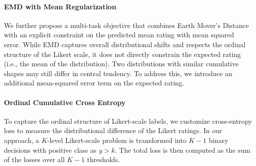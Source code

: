 \documentclass{article} %
\begin{document}
\paragraph{EMD with Mean Regularization}

We further propose a multi-task objective that combines
Earth Mover's Distance with an explicit constraint on the predicted mean rating with mean squared error. {While EMD captures
overall distributional shifts and respects the ordinal
structure of the Likert scale, it does not directly constrain
the expected rating (i.e., the mean of the distribution).
Two distributions with similar cumulative shapes
may still differ in central tendency.
To address this, we introduce an additional mean-squared error
term on the expected rating.} 








\paragraph{Ordinal Cumulative Cross Entropy}

To capture the ordinal structure of Likert-scale labels, we customize cross-entropy loss to measure the distributional difference of the Likert ratings. In our approach, a $K$-level Likert-scale problem is transformed into $K-1$ binary decisions with positive class as $y > k$. The total loss is then computed as the sum of the losses over all $K-1$ thresholds.
\end{document}
